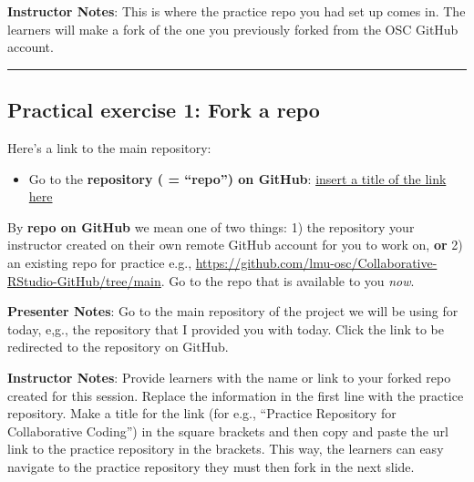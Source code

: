 \documentclass[
  letterpaper,
  DIV=11,
  numbers=noendperiod]{scrartcl}
\providecommand{\tightlist}{%
  \setlength{\itemsep}{0pt}\setlength{\parskip}{0pt}}
\begin{document}
\textbf{Instructor Notes}: This is where the practice repo you had set
up comes in. The learners will make a fork of the one you previously
forked from the OSC GitHub account.

\begin{center}\rule{0.5\linewidth}{0.5pt}\end{center}

\subsection{Practical exercise 1: Fork a
repo}\label{practical-exercise-1-fork-a-repo}

Here's a link to the main repository:

\begin{itemize}
\tightlist
\item[$\square$]
  Go to the \textbf{repository ( = ``repo'') on GitHub}:
  \href{insert\%20the\%20link\%20to\%20the\%20practice\%20reposiory\%20here}{insert
  a title of the link here}
\end{itemize}

\begin{tcolorbox}[enhanced jigsaw, arc=.35mm, bottomrule=.15mm, bottomtitle=1mm, breakable, colback=white, colbacktitle=quarto-callout-important-color!10!white, colframe=quarto-callout-important-color-frame, coltitle=black, left=2mm, leftrule=.75mm, opacityback=0, opacitybacktitle=0.6, rightrule=.15mm, title=\textcolor{quarto-callout-important-color}{\faExclamation}\hspace{0.5em}{What is meant by ``\textbf{repo}'' here?}, titlerule=0mm, toprule=.15mm, toptitle=1mm]

By \textbf{repo on GitHub} we mean one of two things: 1) the repository
your instructor created on their own remote GitHub account for you to
work on, \textbf{or} 2) an existing repo for practice e.g.,
\url{https://github.com/lmu-osc/Collaborative-RStudio-GitHub/tree/main}.
Go to the repo that is available to you \emph{now}.

\end{tcolorbox}

\textbf{Presenter Notes}: Go to the main repository of the project we
will be using for today, e,g., the repository that I provided you with
today. Click the link to be redirected to the repository on GitHub.

\textbf{Instructor Notes}: Provide learners with the name or link to
your forked repo created for this session. Replace the information in
the first line with the practice repository. Make a title for the link
(for e.g., ``Practice Repository for Collaborative Coding'') in the
square brackets and then copy and paste the url link to the practice
repository in the brackets. This way, the learners can easy navigate to
the practice repository they must then fork in the next slide.
\end{document}

